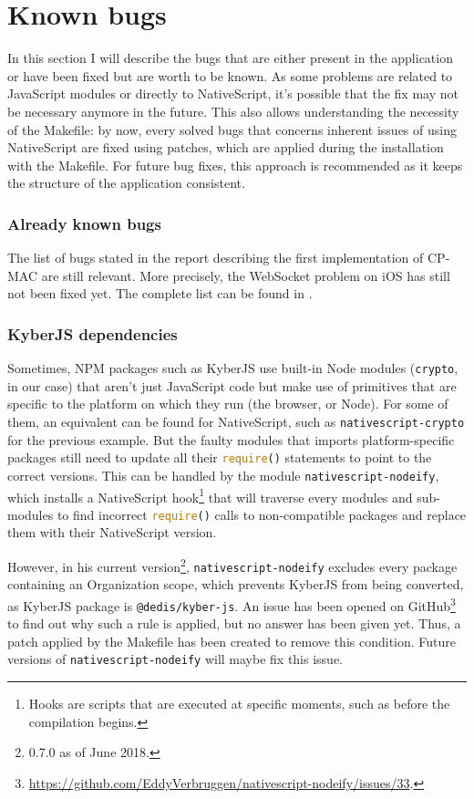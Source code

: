 \section{Known bugs}
In this section I will describe the bugs that are either present in the application or have been fixed but are worth to be known. As some problems are related to JavaScript modules or directly to NativeScript, it's possible that the fix may not be necessary anymore in the future. This also allows understanding the necessity of the Makefile: by now, every solved bugs that concerns inherent issues of using NativeScript are fixed using patches, which are applied during the installation with the Makefile. For future bug fixes, this approach is recommended as it keeps the structure of the appli\-cation consistent.

\subsubsection*{Already known bugs}
The list of bugs stated in the report describing the first implementation of CP-MAC are still relevant. More precisely, the WebSocket problem on iOS has still not been fixed yet. The complete list can be found in \cite{petrimaire2018}.

\subsubsection*{KyberJS dependencies}
Sometimes, NPM packages such as KyberJS use built-in Node modules (\texttt{crypto}, in our case) that aren't just JavaScript code but make use of primitives that are specific to the platform on which they run (the browser, or Node). For some of them, an equivalent can be found for NativeScript, such as \texttt{nativescript-crypto} for the previous example. But the faulty modules that imports platform-specific packages still need to update all their \lstinline[language=JavaScript]|require()| statements to point to the correct versions. This can be handled by the module \texttt{nativescript-nodeify}, which installs a NativeScript hook\footnote{Hooks are scripts that are executed at specific moments, such as before the compilation begins.} that will traverse every modules and sub-modules to find incorrect \lstinline[language=JavaScript]|require()| calls to non-compatible packages and replace them with their NativeScript version.

However, in his current version\footnote{0.7.0 as of June 2018.}, \texttt{nativescript-nodeify} excludes every package containing an Organization scope, which prevents KyberJS from being converted, as KyberJS package is \texttt{@dedis/kyber-js}. An issue has been opened on GitHub\footnote{\url{https://github.com/EddyVerbruggen/nativescript-nodeify/issues/33}.} to find out why such a rule is applied, but no answer has been given yet. Thus, a patch applied by the Makefile has been created to remove this condition. Future versions of \texttt{nativescript-nodeify} will maybe fix this issue.

